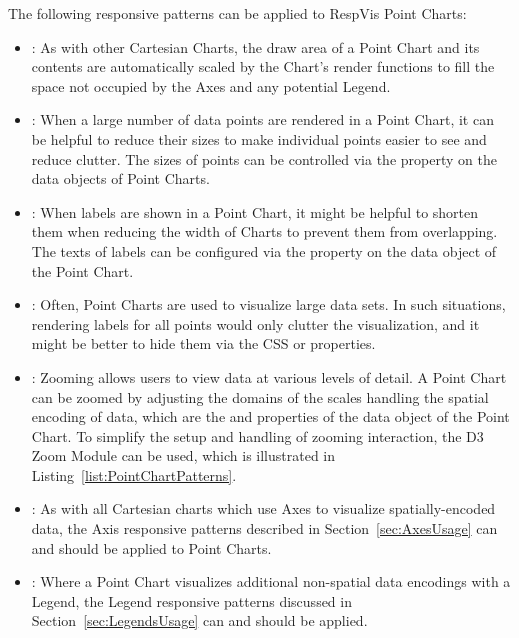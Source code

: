 The following responsive patterns can be applied to RespVis Point
Charts:
\begin{itemize}
\item {}: As with other Cartesian Charts, the
  draw area of a Point Chart and its contents are automatically
  scaled by the Chart's render functions to fill the space not
  occupied by the Axes and any potential Legend.

\item {}: When a large number of data points are
  rendered in a Point Chart, it can be helpful to reduce their sizes
  to make individual points easier to see and reduce clutter. The
  sizes of points can be controlled via the  property
  on the data objects of Point Charts.

\item {}: When labels are shown in a Point
  Chart, it might be helpful to shorten them when reducing the width
  of Charts to prevent them from overlapping. The texts of labels can
  be configured via the  property on the data object of
  the Point Chart.

\item {}: Often, Point Charts are used to
  visualize large data sets. In such situations, rendering labels
  for all points would only clutter the visualization, and it might be
  better to hide them via the CSS  or 
  properties.

\item {}: Zooming allows users to view data at
  various levels of detail. A Point Chart can be zoomed by adjusting
  the domains of the scales handling the spatial encoding of data,
  which are the  and  properties of the data
  object of the Point Chart. To simplify the setup and handling of
  zooming interaction, the D3 Zoom Module \parencite{D3Zoom} can be
  used, which is illustrated in Listing~\ref{list:PointChartPatterns}.

\item {}: As with all Cartesian charts
  which use Axes to visualize spatially-encoded data, the
  Axis responsive patterns described in Section~\ref{sec:AxesUsage} can and
  should be applied to Point Charts.

\item {}: Where a Point Chart visualizes
  additional non-spatial data encodings with a Legend, the Legend
  responsive patterns discussed in Section~\ref{sec:LegendsUsage} can
  and should be applied.
\end{itemize}

